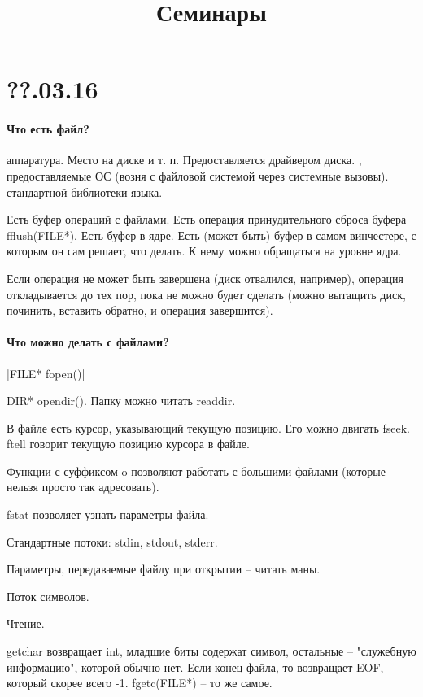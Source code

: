\documentclass[a4paper,10pt]{article}
\title{\textbf{Семинары}}
\newcommand{\cl}{\mint{c}}
\begin{document}
\maketitle

\section{??.03.16}

\paragraph{Что есть файл?}

\begin{enumerate}
 аппаратура. Место на диске и т. п. Предоставляется драйвером диска.
, предоставляемые ОС (возня с файловой системой через системные вызовы).
 стандартной библиотеки языка.
\end{enumerate}
Есть буфер операций с файлами. Есть операция принудительного сброса буфера fflush(FILE*). Есть буфер в ядре. Есть (может быть) буфер в самом винчестере, с которым он сам решает, что делать. К нему можно обращаться на уровне ядра.

Если операция не может быть завершена (диск отвалился, например), операция откладывается до тех пор, пока не можно будет сделать (можно вытащить диск, починить, вставить обратно, и операция завершится).


\paragraph{Что можно делать с файлами?}

\cl|FILE* fopen()|

DIR* opendir(). Папку можно читать readdir.

В файле есть курсор, указывающий текущую позицию. Его можно двигать fseek. ftell говорит текущую позицию курсора в файле.

Функции с суффиксом o позволяют работать с большими файлами (которые нельзя просто так адресовать).

fstat позволяет узнать параметры файла.

Стандартные потоки: stdin, stdout, stderr.

Параметры, передаваемые файлу при открытии -- читать маны.

Поток символов.

Чтение. 

getchar возвращает int, младшие биты содержат символ, остальные -- "служебную информацию", которой обычно нет. Если конец файла, то возвращает EOF, который скорее всего -1. fgetc(FILE*) -- то же самое.
\end{document}
